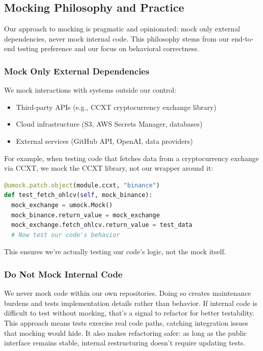 \subsection{Mocking Philosophy and Practice}
Our approach to mocking is pragmatic and opinionated: mock only external
dependencies, never mock internal code. This philosophy stems from our end-to-end
testing preference and our focus on behavioral correctness.

\subsubsection{Mock Only External Dependencies}
We mock interactions with systems outside our control:
\begin{itemize}
  \item Third-party APIs (e.g., CCXT cryptocurrency exchange library)

  \item Cloud infrastructure (S3, AWS Secrets Manager, databases)

  \item External services (GitHub API, OpenAI, data providers)
\end{itemize}
For example, when testing code that fetches data from a cryptocurrency
exchange via CCXT, we mock the CCXT library, not our wrapper around it:

\begin{lstlisting}[language=Python]
@umock.patch.object(module.ccxt, "binance")
def test_fetch_ohlcv(self, mock_binance):
  mock_exchange = umock.Mock()
  mock_binance.return_value = mock_exchange
  mock_exchange.fetch_ohlcv.return_value = test_data
  # Now test our code's behavior
\end{lstlisting}
This ensures we're actually testing our code's logic, not the mock
itself.

\subsubsection{Do Not Mock Internal Code}
We never mock code within our own repositories. Doing so creates
maintenance burdens and tests implementation details rather than
behavior. If internal code is difficult to test without mocking, that's
a signal to refactor for better testability. This approach means tests exercise
real code paths, catching integration issues that mocking would hide. It
also makes refactoring safer: as long as the public interface remains
stable, internal restructuring doesn't require updating tests.

